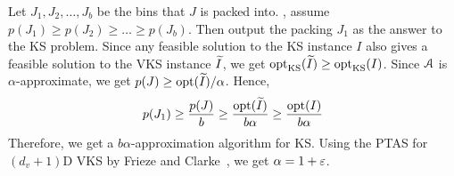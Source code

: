 Let $J_1, J_2, \ldots, J_b$ be the bins that $J$ is packed into.
\WLoG, assume $p(J_1) \ge p(J_2) \ge \ldots \ge p(J_b)$. Then output the packing $J_1$
as the answer to the  KS problem.
Since any feasible solution to the  KS instance $I$ also gives a
feasible solution to the VKS instance $\widetilde{I}$, we get
$\operatorname{opt}_{\mathrm{KS}}(\widetilde{I}) \ge \operatorname{opt}_{\mathrm{KS}}(I)$.
Since $\mathcal{A}$ is $\alpha$-approximate, we get $p(J) \ge \operatorname{opt}(\widetilde{I})/\alpha$. Hence,
\[ p(J_1) \ge \frac{p(J)}{b}
\ge \frac{\operatorname{opt}(\widetilde{I})}{b\alpha}
\ge \frac{\operatorname{opt}(I)}{b\alpha} \]
Therefore, we get a $b\alpha$-approximation algorithm for  KS.
Using the PTAS for $(d_v+1)$D VKS by Frieze and Clarke~\cite{frieze1984approximation},
we get $\alpha = 1+\varepsilon$.
